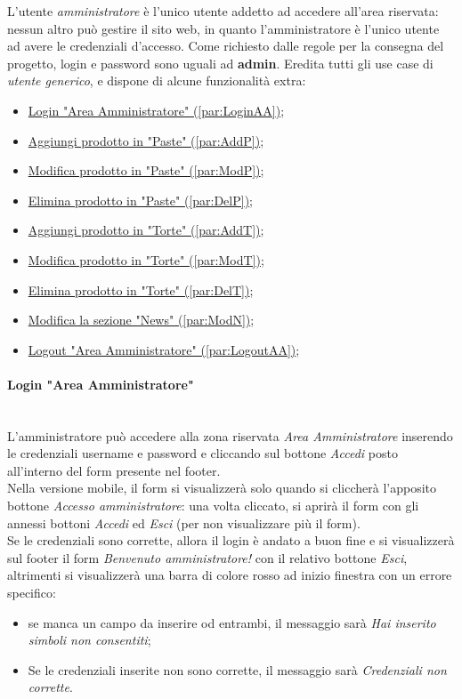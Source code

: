 L'utente \emph{amministratore} è l'unico utente addetto ad accedere all'area riservata: nessun altro può gestire il sito web, in quanto l'amministratore è l'unico utente ad avere le credenziali d'accesso.  Come richiesto dalle regole per la consegna del progetto, login e password sono uguali ad \textbf{admin}. Eredita tutti gli use case di \textit{utente generico}, e dispone di alcune funzionalità extra:
\begin{itemize}
	\item \hyperref[par:LoginAA]{ Login "Area Amministratore" (\ref{par:LoginAA})};
	\item \hyperref[par:AddP]{ Aggiungi prodotto in "Paste" (\ref{par:AddP})};
	\item \hyperref[par:ModP]{ Modifica prodotto in "Paste" (\ref{par:ModP})};
	\item \hyperref[par:DelP]{ Elimina prodotto in "Paste" (\ref{par:DelP})};
	\item \hyperref[par:AddT]{ Aggiungi prodotto in "Torte" (\ref{par:AddT})};
	\item \hyperref[par:ModT]{ Modifica prodotto in "Torte" (\ref{par:ModT})};
	\item \hyperref[par:DelT]{ Elimina prodotto in "Torte" (\ref{par:DelT})};
	\item \hyperref[par:ModN]{ Modifica la sezione "News" (\ref{par:ModN})};
	\item \hyperref[par:LogoutAA]{ Logout "Area Amministratore" (\ref{par:LogoutAA})};
\end{itemize}

\paragraph{Login "Area Amministratore"}\mbox{}\\
\label{par:LoginAA}
L'amministratore può accedere alla zona riservata \emph{Area Amministratore} inserendo le credenziali username e password e cliccando sul bottone \emph{Accedi} posto all'interno del form presente nel footer.\\ Nella versione mobile, il form si visualizzerà solo quando si cliccherà l'apposito bottone \emph{Accesso amministratore}: una volta cliccato, si aprirà il form con gli annessi bottoni \emph{Accedi} ed \emph{Esci} (per non visualizzare più il form).\\ Se le credenziali sono corrette, allora il login è andato a buon fine e si visualizzerà sul footer il form \emph{Benvenuto amministratore!} con il relativo bottone \emph{Esci}, altrimenti si visualizzerà una barra di colore rosso ad inizio finestra con un errore specifico:
\begin{itemize}
	\item se manca un campo da inserire od entrambi, il messaggio sarà \emph{Hai inserito simboli non consentiti};
	\item Se le credenziali inserite non sono corrette, il messaggio sarà \emph{Credenziali non corrette}.
\end{itemize}


